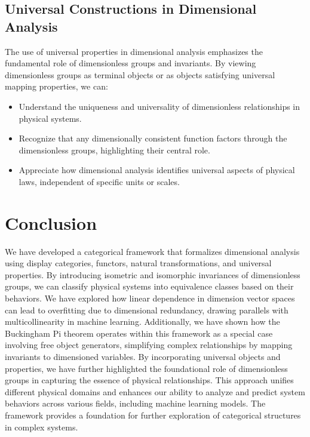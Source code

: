 \documentclass{article}
\theoremstyle{definition}
\theoremstyle{remark}
\begin{document}
	\subsection{Universal Constructions in Dimensional Analysis}
	
	The use of universal properties in dimensional analysis emphasizes the fundamental role of dimensionless groups and invariants. By viewing dimensionless groups as terminal objects or as objects satisfying universal mapping properties, we can:
	
	\begin{itemize}
		\item Understand the uniqueness and universality of dimensionless relationships in physical systems.
		\item Recognize that any dimensionally consistent function factors through the dimensionless groups, highlighting their central role.
		\item Appreciate how dimensional analysis identifies universal aspects of physical laws, independent of specific units or scales.
	\end{itemize}
	
	\section{Conclusion}
	
	We have developed a categorical framework that formalizes dimensional analysis using display categories, functors, natural transformations, and universal properties. By introducing isometric and isomorphic invariances of dimensionless groups, we can classify physical systems into equivalence classes based on their behaviors. We have explored how linear dependence in dimension vector spaces can lead to overfitting due to dimensional redundancy, drawing parallels with multicollinearity in machine learning. Additionally, we have shown how the Buckingham Pi theorem operates within this framework as a special case involving free object generators, simplifying complex relationships by mapping invariants to dimensioned variables. By incorporating universal objects and properties, we have further highlighted the foundational role of dimensionless groups in capturing the essence of physical relationships. This approach unifies different physical domains and enhances our ability to analyze and predict system behaviors across various fields, including machine learning models. The framework provides a foundation for further exploration of categorical structures in complex systems.
	
\end{document}
